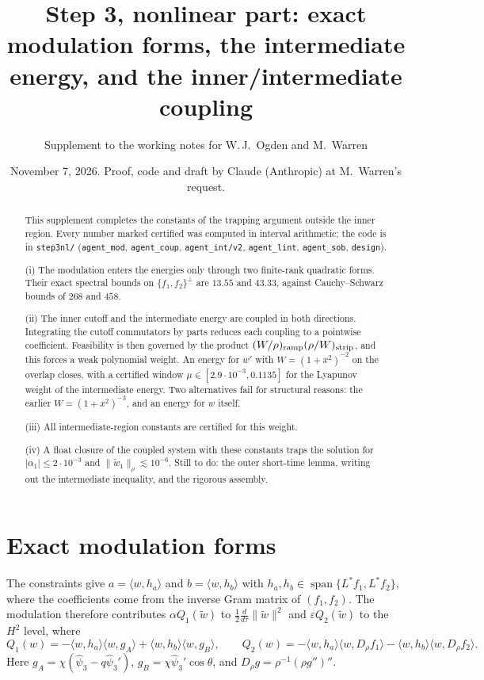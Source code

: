 \documentclass[11pt]{amsart}
\title[Step 3: far field and coupling]{Step 3, nonlinear part: exact modulation forms, the intermediate energy, and the inner/intermediate coupling}
\author{Supplement to the working notes for W.\,J.~Ogden and M.~Warren}
\date{November 7, 2026. Proof, code and draft by Claude (Anthropic) at M.~Warren's request.}
\theoremstyle{remark}
\newcommand{\eps}{\varepsilon}
\newcommand{\ip}[2]{\langle #1,#2\rangle}
\begin{document}
\begin{abstract}
This supplement completes the constants of the trapping argument outside the inner region. Every number marked certified was computed in interval arithmetic; the code is in \texttt{step3nl/} (\texttt{agent\_mod}, \texttt{agent\_coup}, \texttt{agent\_int/v2}, \texttt{agent\_lint}, \texttt{agent\_sob}, \texttt{design}).

(i) The modulation enters the energies only through two finite-rank quadratic forms. Their exact spectral bounds on $\{f_1,f_2\}^\perp$ are $13.55$ and $43.33$, against Cauchy--Schwarz bounds of $268$ and $458$.

(ii) The inner cutoff and the intermediate energy are coupled in both directions. Integrating the cutoff commutators by parts reduces each coupling to a pointwise coefficient. Feasibility is then governed by the product $(W/\rho)_{\rm ramp}(\rho/W)_{\rm strip}$, and this forces a weak polynomial weight. An energy for $w'$ with $W=(1+x^2)^{-2}$ on the overlap closes, with a certified window $\mu\in[2.9\cdot10^{-3},0.1135]$ for the Lyapunov weight of the intermediate energy. Two alternatives fail for structural reasons: the earlier $W=(1+x^2)^{-3}$, and an energy for $w$ itself.

(iii) All intermediate-region constants are certified for this weight.

(iv) A float closure of the coupled system with these constants traps the solution for $|\alpha_1|\le2\cdot10^{-3}$ and $\|\tilde w_1\|_\rho\lesssim10^{-6}$. Still to do: the outer short-time lemma, writing out the intermediate inequality, and the rigorous assembly.
\end{abstract}
\maketitle

\section{Exact modulation forms}
The constraints give $a=\ip{w}{h_a}$ and $b=\ip{w}{h_b}$ with $h_a,h_b\in\operatorname{span}\{L^*f_1,L^*f_2\}$, where the coefficients come from the inverse Gram matrix of $(f_1,f_2)$. The modulation therefore contributes $\alpha Q_1(\tilde w)$ to $\frac12\frac{d}{d\tau}\|\tilde w\|^2$ and $\eps Q_2(\tilde w)$ to the $H^2$ level, where
\[
Q_1(w)=-\ip{w}{h_a}\ip{w}{g_A}+\ip{w}{h_b}\ip{w}{g_B},\qquad Q_2(w)=-\ip{w}{h_a}\ip{w}{D_\rho f_1}-\ip{w}{h_b}\ip{w}{D_\rho f_2}.
\]
Here $g_A=\chi(\hat\psi_3-q\hat\psi_3')$, $g_B=\chi\hat\psi_3'\cos\theta$, and $D_\rho g=\rho^{-1}(\rho g'')''$.
\end{document}
